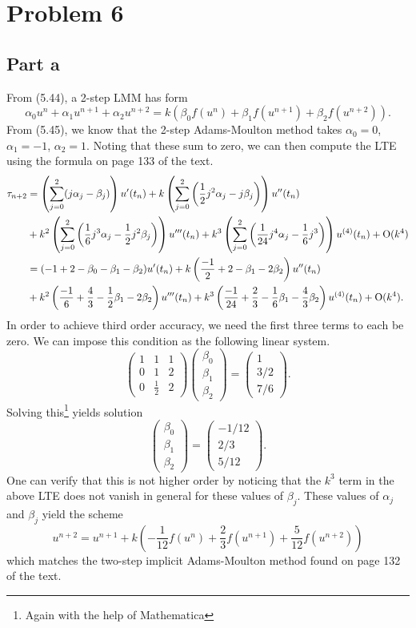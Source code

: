 \documentclass{article}
\begin{document}
\section{Problem 6}
\subsection{Part a}
From (5.44), a 2-step LMM has form
\[
\alpha_0u^n+\alpha_1u^{n+1}+\alpha_2u^{n+2}=k\left(\beta_0f(u^n)+\beta_1f(u^{n+1})+\beta_2f(u^{n+2})\right).
\]
From (5.45), we know that the 2-step Adams-Moulton method takes $\alpha_0=0$, $\alpha_1=-1$, $\alpha_2=1$. Noting that these sum to zero, we can then compute the LTE using the formula on page 133 of the text. 
\begin{align*}
\tau_{n+2}&=\left(\sum_{j=0}^2(j\alpha_j-\beta_j)\right)u'(t_n)+k\left(\sum_{j=0}^2\left(\frac{1}{2}j^2\alpha_j-j\beta_j\right)\right)u''(t_n)\\&+k^2\left(\sum_{j=0}^2\left(\frac{1}{6}j^3\alpha_j-\frac{1}{2}j^2\beta_j\right)\right)u'''(t_n)+k^3\left(\sum_{j=0}^2\left(\frac{1}{24}j^4\alpha_j-\frac{1}{6}j^3\right)\right)u^{(4)}(t_n)+\operatorname{O}(k^4)\\&=
(-1+2-\beta_0-\beta_1-\beta_2)u'(t_n)+k\left(\frac{-1}{2}+2-\beta_1-2\beta_2\right)u''(t_n)\\&+k^2\left(\frac{-1}{6}+\frac{4}{3}-\frac{1}{2}\beta_1-2\beta_2\right)u'''(t_n)+k^3\left(\frac{-1}{24}+\frac{2}{3}-\frac{1}{6}\beta_1-\frac{4}{3}\beta_2\right)u^{(4)}(t_n)+\operatorname{O}(k^4).
\end{align*}
In order to achieve third order accuracy, we need the first three terms to each be zero. We can impose this condition as the following linear system. 
\[
\begin{pmatrix}
	1&1&1\\
	0&1&2\\
	0&\frac{1}{2}&2
\end{pmatrix}\begin{pmatrix}
\beta_0\\\beta_1\\\beta_2
\end{pmatrix}=\begin{pmatrix}
1\\3/2\\7/6
\end{pmatrix}.
\]
Solving this\footnote{Again with the help of Mathematica} yields solution
\[
\begin{pmatrix}
	\beta_0\\\beta_1\\\beta_2
\end{pmatrix}=\begin{pmatrix}
	-1/12\\
	2/3\\
5/12
\end{pmatrix}.
\]
One can verify that this is not higher order by noticing that the $k^3$ term in the above LTE does not vanish in general for these values of $\beta_j$. These values of $\alpha_j$ and $\beta_j$ yield the scheme 
\[
u^{n+2}=u^{n+1}+k\left(-\frac{1}{12}f(u^n)+\frac{2}{3}f(u^{n+1})+\frac{5}{12}f(u^{n+2})\right)
\]
which matches the two-step implicit Adams-Moulton method found on page 132 of the text.
\end{document}
